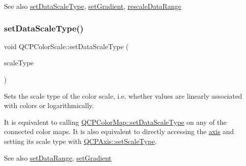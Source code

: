 \begin{DoxySeeAlso}{See also}
\hyperlink{class_q_c_p_color_scale_aeb6107d67dd7325145b2498abae67fc3}{set\+Data\+Scale\+Type}, \hyperlink{class_q_c_p_color_scale_a1f29583bb6f1e7f473b62fb712be3940}{set\+Gradient}, \hyperlink{class_q_c_p_color_scale_a425983db4478543924ddbd04ea20a356}{rescale\+Data\+Range} 
\end{DoxySeeAlso}
\mbox{\label{class_q_c_p_color_scale_aeb6107d67dd7325145b2498abae67fc3}} 
\subsubsection{\texorpdfstring{set\+Data\+Scale\+Type()}{setDataScaleType()}}
{\footnotesize\ttfamily void Q\+C\+P\+Color\+Scale\+::set\+Data\+Scale\+Type (\begin{DoxyParamCaption}\item[{\hyperlink{class_q_c_p_axis_a36d8e8658dbaa179bf2aeb973db2d6f0}{Q\+C\+P\+Axis\+::\+Scale\+Type}}]{scale\+Type }\end{DoxyParamCaption})}

Sets the scale type of the color scale, i.\+e. whether values are linearly associated with colors or logarithmically.

It is equivalent to calling \hyperlink{class_q_c_p_color_map_a9d20aa08e3c1f20f22908c45b9c06511}{Q\+C\+P\+Color\+Map\+::set\+Data\+Scale\+Type} on any of the connected color maps. It is also equivalent to directly accessing the \hyperlink{class_q_c_p_color_scale_a39bdbdb3b212602a5a57f9f3ea444190}{axis} and setting its scale type with \hyperlink{class_q_c_p_axis_adef29cae617af4f519f6c40d1a866ca6}{Q\+C\+P\+Axis\+::set\+Scale\+Type}.

\begin{DoxySeeAlso}{See also}
\hyperlink{class_q_c_p_color_scale_abe88633003a26d1e756aa74984587fef}{set\+Data\+Range}, \hyperlink{class_q_c_p_color_scale_a1f29583bb6f1e7f473b62fb712be3940}{set\+Gradient} 
\end{DoxySeeAlso}
\mbox{\label{class_q_c_p_color_scale_a1f29583bb6f1e7f473b62fb712be3940}} 
